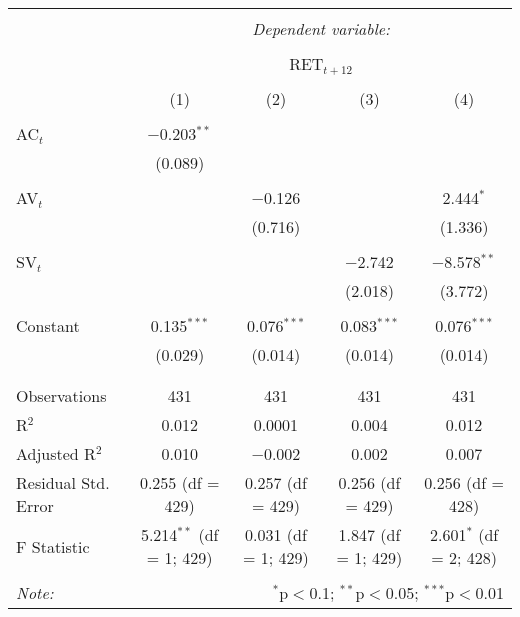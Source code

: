 
\begin{table}[!htbp] \centering 
  \caption{} 
  \label{} 
\begin{tabular}{@{\extracolsep{5pt}}lcccc} 
\\[-1.8ex]\hline 
\hline \\[-1.8ex] 
 & \multicolumn{4}{c}{\textit{Dependent variable:}} \\ 
\cline{2-5} 
\\[-1.8ex] & \multicolumn{4}{c}{RET$_{t+12}$} \\ 
\\[-1.8ex] & (1) & (2) & (3) & (4)\\ 
\hline \\[-1.8ex] 
 AC$_{t}$ & $-$0.203$^{**}$ &  &  &  \\ 
  & (0.089) &  &  &  \\ 
  & & & & \\ 
 AV$_{t}$ &  & $-$0.126 &  & 2.444$^{*}$ \\ 
  &  & (0.716) &  & (1.336) \\ 
  & & & & \\ 
 SV$_{t}$ &  &  & $-$2.742 & $-$8.578$^{**}$ \\ 
  &  &  & (2.018) & (3.772) \\ 
  & & & & \\ 
 Constant & 0.135$^{***}$ & 0.076$^{***}$ & 0.083$^{***}$ & 0.076$^{***}$ \\ 
  & (0.029) & (0.014) & (0.014) & (0.014) \\ 
  & & & & \\ 
\hline \\[-1.8ex] 
Observations & 431 & 431 & 431 & 431 \\ 
R$^{2}$ & 0.012 & 0.0001 & 0.004 & 0.012 \\ 
Adjusted R$^{2}$ & 0.010 & $-$0.002 & 0.002 & 0.007 \\ 
Residual Std. Error & 0.255 (df = 429) & 0.257 (df = 429) & 0.256 (df = 429) & 0.256 (df = 428) \\ 
F Statistic & 5.214$^{**}$ (df = 1; 429) & 0.031 (df = 1; 429) & 1.847 (df = 1; 429) & 2.601$^{*}$ (df = 2; 428) \\ 
\hline 
\hline \\[-1.8ex] 
\textit{Note:}  & \multicolumn{4}{r}{$^{*}$p$<$0.1; $^{**}$p$<$0.05; $^{***}$p$<$0.01} \\ 
\end{tabular} 
\end{table} 
